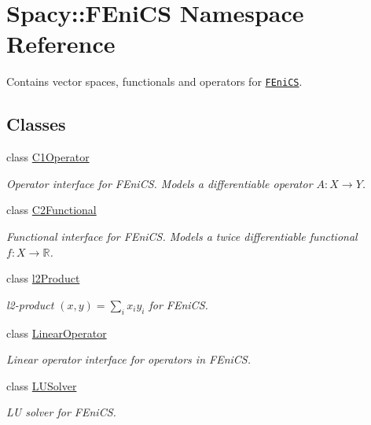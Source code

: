 \hypertarget{namespaceSpacy_1_1FEniCS}{\section{Spacy\-:\-:F\-Eni\-C\-S Namespace Reference}
\label{namespaceSpacy_1_1FEniCS}
}


Contains vector spaces, functionals and operators for \href{www.fenicsproject.org}{\tt F\-Eni\-C\-S}.  


\subsection*{Classes}
\begin{DoxyCompactItemize}
\item 
class \hyperlink{classSpacy_1_1FEniCS_1_1C1Operator}{C1\-Operator}
\begin{DoxyCompactList}\small\item\em Operator interface for F\-Eni\-C\-S. Models a differentiable operator $A:X\rightarrow Y$. \end{DoxyCompactList}\item 
class \hyperlink{classSpacy_1_1FEniCS_1_1C2Functional}{C2\-Functional}
\begin{DoxyCompactList}\small\item\em Functional interface for F\-Eni\-C\-S. Models a twice differentiable functional $f:X\rightarrow \mathbb{R}$. \end{DoxyCompactList}\item 
class \hyperlink{classSpacy_1_1FEniCS_1_1l2Product}{l2\-Product}
\begin{DoxyCompactList}\small\item\em l2-\/product $(x,y) = \sum_i x_i y_i $ for F\-Eni\-C\-S. \end{DoxyCompactList}\item 
class \hyperlink{classSpacy_1_1FEniCS_1_1LinearOperator}{Linear\-Operator}
\begin{DoxyCompactList}\small\item\em Linear operator interface for operators in F\-Eni\-C\-S. \end{DoxyCompactList}\item 
class \hyperlink{classSpacy_1_1FEniCS_1_1LUSolver}{L\-U\-Solver}
\begin{DoxyCompactList}\small\item\em L\-U solver for F\-Eni\-C\-S. \end{DoxyCompactList}\item 

\end{DoxyCompactItemize}
